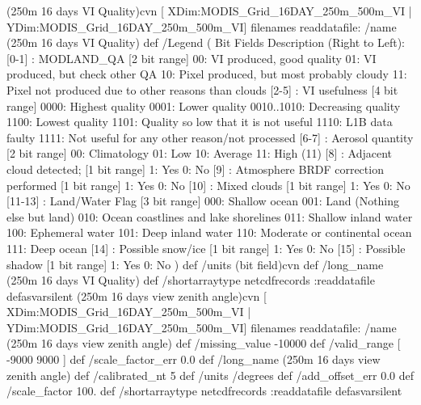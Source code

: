  (250m 16 days VI Quality)cvn{
[ XDim:MODIS_Grid_16DAY_250m_500m_VI | YDim:MODIS_Grid_16DAY_250m_500m_VI] filenames readdatafile:
/name (250m 16 days VI Quality) def
 /Legend (
	 Bit Fields Description (Right to Left): 
	[0-1] : MODLAND_QA [2 bit range] 
		 00: VI produced, good quality 
		 01: VI produced, but check other QA 
		 10: Pixel produced, but most probably cloudy 
		 11: Pixel not produced due to other reasons than clouds 
	[2-5] : VI usefulness [4 bit range] 
		 0000: Highest quality 
		 0001: Lower quality  
		 0010..1010: Decreasing quality 
		 1100: Lowest quality 
		 1101: Quality so low that it is not useful 
		 1110: L1B data faulty 
		 1111: Not useful for any other reason/not processed 
	[6-7] : Aerosol quantity [2 bit range] 
		 00: Climatology 
		 01: Low 
		 10: Average 
		 11: High (11) 
	[8] : Adjacent cloud detected; [1 bit range] 
		 1: Yes 
		 0: No 
	[9] : Atmosphere BRDF correction performed [1 bit range] 
		 1: Yes 
		 0: No 
	[10] : Mixed clouds  [1 bit range] 
		 1: Yes 
		 0: No 
	[11-13] : Land/Water Flag [3 bit range] 
		 000: Shallow ocean 
		 001: Land (Nothing else but land) 
		 010: Ocean coastlines and lake shorelines 
		 011: Shallow inland water 
		 100: Ephemeral water 
		 101: Deep inland water 
		 110: Moderate or continental ocean 
		 111: Deep ocean 
	[14] : Possible snow/ice [1 bit range] 
		 1: Yes 
		 0: No 
	[15] : Possible shadow [1 bit range] 
		 1: Yes 
		 0: No 
) def
 /units (bit field)cvn def
 /long_name (250m 16 days VI Quality) def
 /shortarraytype netcdfrecords :readdatafile
}defasvarsilent
 (250m 16 days view zenith angle)cvn{
[ XDim:MODIS_Grid_16DAY_250m_500m_VI | YDim:MODIS_Grid_16DAY_250m_500m_VI] filenames readdatafile:
/name (250m 16 days view zenith angle) def
 /missing_value -10000 def
 /valid_range [ -9000 9000 ] def
 /scale_factor_err 0.0 def
 /long_name (250m 16 days view zenith angle) def
 /calibrated_nt 5 def
 /units /degrees def
 /add_offset_err 0.0 def
 /scale_factor 100. def
 /shortarraytype netcdfrecords :readdatafile
}defasvarsilent
